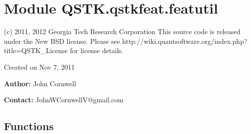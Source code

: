 %
%
%


\section{Module QSTK.qstkfeat.featutil}

    \label{QSTK:qstkfeat:featutil}
(c) 2011, 2012 Georgia Tech Research Corporation This source code is 
released under the New BSD license.  Please see 
http://wiki.quantsoftware.org/index.php?title=QSTK\_License for license 
details.

Created on Nov 7, 2011

\textbf{Author:} John Cornwell



\textbf{Contact:} JohnWCornwellV@gmail.com





  \subsection{Functions}

    \label{QSTK:qstkfeat:featutil:getMarketRel}

    \vspace{0.5ex}

